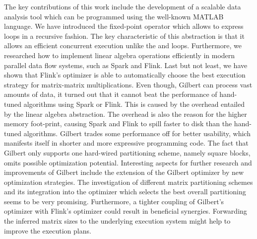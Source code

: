 The key contributions of this work include the development of a scalable data analysis tool which can be programmed using the well-known MATLAB language. We have introduced the fixed-point operator which allows to express loops in a recursive fashion. The key characteristic of this abstraction is that it allows an efficient concurrent execution unlike the  and  loops. Furthermore, we researched how to implement linear algebra operations efficiently in modern parallel data flow systems, such as Spark and Flink. Last but not least, we have shown that Flink's optimizer is able to automatically choose the best execution strategy for matrix-matrix multiplications. Even though, Gilbert can process vast amounts of data, it turned out that it cannot beat the performance of hand-tuned algorithms using Spark or Flink. This is caused by the overhead entailed by the linear algebra abstraction. The overhead is also the reason for the higher memory foot-print, causing Spark and Flink to spill faster to disk than the hand-tuned algorithms. Gilbert trades some performance off for better usability, which manifests itself in shorter and more expressive programming code. The fact that Gilbert only supports one hard-wired partitioning scheme, namely square blocks, omits possible optimization potential. Interesting aspects for further research and improvements of Gilbert include the extension of the Gilbert optimizer by new optimization strategies. The investigation of different matrix partitioning schemes and its integration into the optimizer which selects the best overall partitioning seems to be very promising. Furthermore, a tighter coupling of Gilbert's optimizer with Flink's optimizer could result in beneficial synergies. Forwarding the inferred matrix sizes to the underlying execution system might help to improve the execution plans.